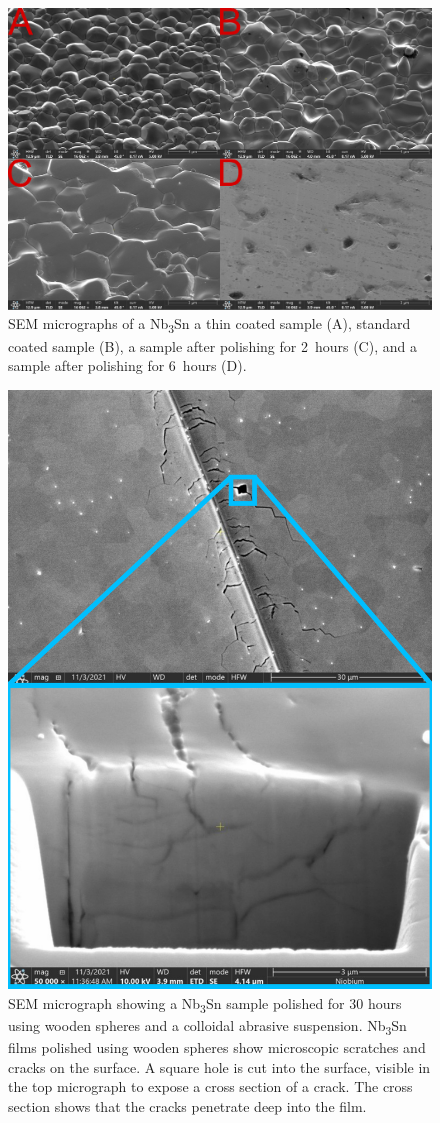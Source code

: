 \documentclass[reprint,amsmath,amssymb,aps]{revtex4-2}%
\begin{document}
\begin{figure}[t]%
\centering%
\includegraphics[width=0.8\columnwidth]{../doc/figs/SEM_Images.png}%
\caption{SEM micrographs of a Nb\textsubscript{3}Sn a thin coated sample (A), standard coated sample (B), a sample after polishing for 2~hours (C), and a sample after polishing for 6~hours (D).}%
\label{fig:semimages}%
\end{figure}

%


\begin{figure}[t]%
\centering%
\includegraphics[width=0.8\columnwidth]{../doc/figs/Sample_Surface_Scratches.png}%
\caption{SEM micrograph showing a Nb\textsubscript{3}Sn sample polished for 30 hours using wooden spheres and a colloidal abrasive suspension. Nb\textsubscript{3}Sn films polished using wooden spheres show microscopic scratches and cracks on the surface. A square hole is cut into the surface, visible in the top micrograph to expose a cross section of a crack. The cross section shows that the cracks penetrate deep into the film.}%
\label{fig:samplesurfacescratches}%
\end{figure}
\end{document}
